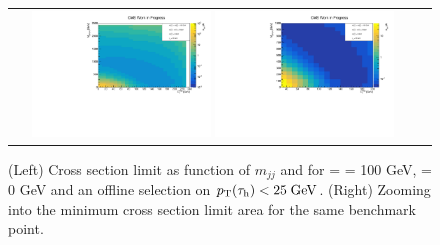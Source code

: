 \begin{figure}[tbh!]
	\centering
	\begin{tabular}{cc}
		\includegraphics[width=0.45\textwidth]{analysis/pics/JetInvMass_vs_MET_xsec_chi100_lsp000_taupt25.pdf}
		\includegraphics[width=0.45\textwidth]{analysis/pics/JetInvMass_vs_MET_xsec_chi100_lsp000_taupt25_zoom.pdf}
	\end{tabular}
	\caption{(Left) Cross section limit as function of $m_{jj}$ and \met for \charginopm = \neutralinotwo = 100 GeV, \neutralinoone = 0 GeV and an offline selection on $p_{\text{T}}(\tau_{\text{h}}) <  25\;\text{Ge}\kern-0.06667em\text{V}$. (Right) Zooming into the minimum cross section limit area for the same benchmark point.}
	\label{fig::JetInvMass_vs_MET_xsec_chi100_lsp000_taupt25}
\end{figure}

